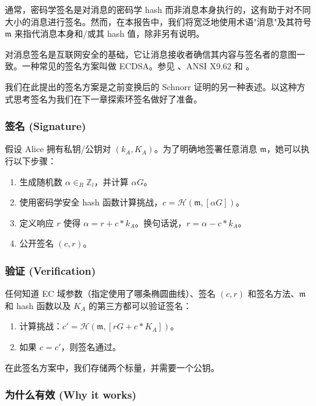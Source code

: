 通常，密码学签名是对消息的密码学 hash 而非消息本身执行的，这有助于对不同大小的消息进行签名。然而，在本报告中，我们将宽泛地使用术语"消息"及其符号 $\mathfrak{m}$ 来指代消息本身和/或其 hash 值，除非另有说明。

对消息签名是互联网安全的基础，它让消息接收者确信其内容与签名者的意图一致。一种常见的签名方案叫做 ECDSA。参见 \cite{ecdsa}、ANSI X9.62 和 \cite{Hankerson:2003:GEC:940321}。

我们在此提出的签名方案是之前变换后的 Schnorr 证明的另一种表述。以这种方式思考签名为我们在下一章探索环签名做好了准备。

\subsubsection*{签名 (Signature)}

假设 Alice 拥有私钥/公钥对 \((k_A, K_A)\)。为了明确地签署任意消息 $\mathfrak{m}$，她可以执行以下步骤：

\begin{enumerate}
	\item 生成随机数 $\alpha \in_R \mathbb{Z}_l$，并计算 $\alpha G$。
	\item 使用密码学安全 hash 函数计算挑战，\(c = \mathcal{H}(\mathfrak{m},[\alpha G])\)。
	\item 定义响应 $r$ 使得 $\alpha = r + c*k_A$。换句话说，$r = \alpha - c*k_A$。
	\item 公开签名 $(c, r)$。
\end{enumerate}

\subsubsection*{验证 (Verification)}

任何知道 EC 域参数（指定使用了哪条椭圆曲线）、签名 $(c,r)$ 和签名方法、$\mathfrak{m}$ 和 hash 函数以及 $K_A$ 的第三方都可以验证签名：

\begin{enumerate}
	\item 计算挑战：\(c' = \mathcal{H}(\mathfrak{m},[r G + c*K_A])\)。
	\item 如果 $c = c'$，则签名通过。
\end{enumerate}

在此签名方案中，我们存储两个标量，并需要一个公钥。

\subsubsection*{为什么有效 (Why it works)}

